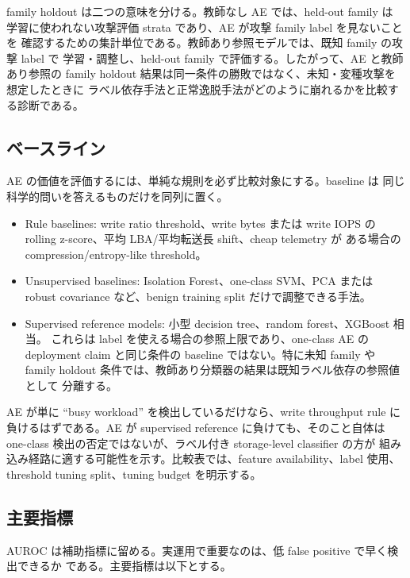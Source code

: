family holdout は二つの意味を分ける。教師なし AE では、held-out family は
学習に使われない攻撃評価 strata であり、AE が攻撃 family label を見ないことを
確認するための集計単位である。教師あり参照モデルでは、既知 family の攻撃 label で
学習・調整し、held-out family で評価する。したがって、AE と教師あり参照の
family holdout 結果は同一条件の勝敗ではなく、未知・変種攻撃を想定したときに
ラベル依存手法と正常逸脱手法がどのように崩れるかを比較する診断である。

\subsection{ベースライン}

AE の価値を評価するには、単純な規則を必ず比較対象にする。baseline は
同じ科学的問いを答えるものだけを同列に置く。

\begin{itemize}
  \item Rule baselines: write ratio threshold、write bytes または write IOPS の
        rolling z-score、平均 LBA/平均転送長 shift、cheap telemetry が
        ある場合の compression/entropy-like threshold。
  \item Unsupervised baselines: Isolation Forest、one-class SVM、PCA または
        robust covariance など、benign training split だけで調整できる手法。
  \item Supervised reference models: 小型 decision tree、random forest、XGBoost 相当。
        これらは label を使える場合の参照上限であり、one-class AE の
        deployment claim と同じ条件の baseline ではない。特に未知 family や
        family holdout 条件では、教師あり分類器の結果は既知ラベル依存の参照値として
        分離する。
\end{itemize}

AE が単に ``busy workload'' を検出しているだけなら、write throughput rule に
負けるはずである。AE が supervised reference に負けても、そのこと自体は
one-class 検出の否定ではないが、ラベル付き storage-level classifier の方が
組み込み経路に適する可能性を示す。比較表では、feature availability、label 使用、
threshold tuning split、tuning budget を明示する。

\subsection{主要指標}

AUROC は補助指標に留める。実運用で重要なのは、低 false positive で早く検出できるか
である。主要指標は以下とする。


